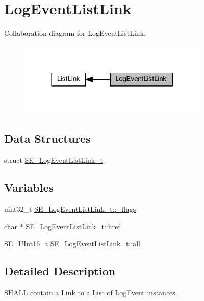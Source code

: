 \hypertarget{group__LogEventListLink}{}\section{Log\+Event\+List\+Link}
\label{group__LogEventListLink}
Collaboration diagram for Log\+Event\+List\+Link\+:\nopagebreak
\begin{figure}[H]
\begin{center}
\leavevmode
\includegraphics[width=258pt]{group__LogEventListLink}
\end{center}
\end{figure}
\subsection*{Data Structures}
\begin{DoxyCompactItemize}
\item 
struct \hyperlink{structSE__LogEventListLink__t}{S\+E\+\_\+\+Log\+Event\+List\+Link\+\_\+t}
\end{DoxyCompactItemize}
\subsection*{Variables}
\begin{DoxyCompactItemize}
\item 
uint32\+\_\+t \hyperlink{group__LogEventListLink_gaa16e99e978e2b29da0be8ebc6f6996e4}{S\+E\+\_\+\+Log\+Event\+List\+Link\+\_\+t\+::\+\_\+flags}
\item 
char $\ast$ \hyperlink{group__LogEventListLink_ga24433e460b3ce5e3caec2498cb0c16e2}{S\+E\+\_\+\+Log\+Event\+List\+Link\+\_\+t\+::href}
\item 
\hyperlink{group__UInt16_gac68d541f189538bfd30cfaa712d20d29}{S\+E\+\_\+\+U\+Int16\+\_\+t} \hyperlink{group__LogEventListLink_ga76f053623ed84ac7494426cdfa5b3cfe}{S\+E\+\_\+\+Log\+Event\+List\+Link\+\_\+t\+::all}
\end{DoxyCompactItemize}


\subsection{Detailed Description}
S\+H\+A\+LL contain a Link to a \hyperlink{structList}{List} of Log\+Event instances. 

